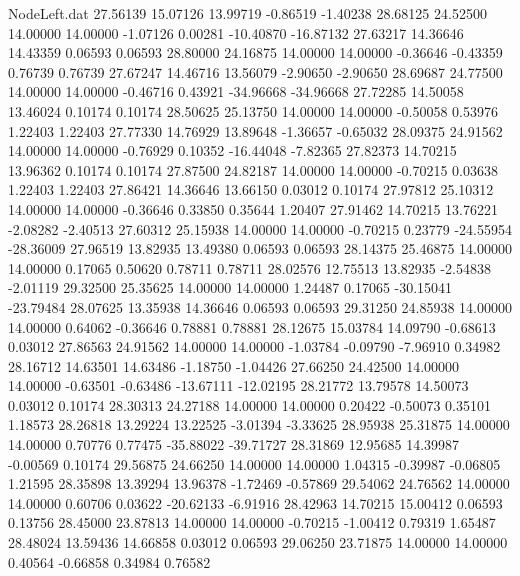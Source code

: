 \begin{filecontents}{NodeLeft.dat}
  27.56139   15.07126   13.99719    -0.86519   -1.40238   28.68125   24.52500   14.00000   14.00000   -1.07126    0.00281  -10.40870  -16.87132
  27.63217   14.36646   14.43359     0.06593    0.06593   28.80000   24.16875   14.00000   14.00000   -0.36646   -0.43359    0.76739    0.76739
  27.67247   14.46716   13.56079    -2.90650   -2.90650   28.69687   24.77500   14.00000   14.00000   -0.46716    0.43921  -34.96668  -34.96668
  27.72285   14.50058   13.46024     0.10174    0.10174   28.50625   25.13750   14.00000   14.00000   -0.50058    0.53976    1.22403    1.22403
  27.77330   14.76929   13.89648    -1.36657   -0.65032   28.09375   24.91562   14.00000   14.00000   -0.76929    0.10352  -16.44048   -7.82365
  27.82373   14.70215   13.96362     0.10174    0.10174   27.87500   24.82187   14.00000   14.00000   -0.70215    0.03638    1.22403    1.22403
  27.86421   14.36646   13.66150     0.03012    0.10174   27.97812   25.10312   14.00000   14.00000   -0.36646    0.33850    0.35644    1.20407
  27.91462   14.70215   13.76221    -2.08282   -2.40513   27.60312   25.15938   14.00000   14.00000   -0.70215    0.23779  -24.55954  -28.36009
  27.96519   13.82935   13.49380     0.06593    0.06593   28.14375   25.46875   14.00000   14.00000    0.17065    0.50620    0.78711    0.78711
  28.02576   12.75513   13.82935    -2.54838   -2.01119   29.32500   25.35625   14.00000   14.00000    1.24487    0.17065  -30.15041  -23.79484
  28.07625   13.35938   14.36646     0.06593    0.06593   29.31250   24.85938   14.00000   14.00000    0.64062   -0.36646    0.78881    0.78881
  28.12675   15.03784   14.09790    -0.68613    0.03012   27.86563   24.91562   14.00000   14.00000   -1.03784   -0.09790   -7.96910    0.34982
  28.16712   14.63501   14.63486    -1.18750   -1.04426   27.66250   24.42500   14.00000   14.00000   -0.63501   -0.63486  -13.67111  -12.02195
  28.21772   13.79578   14.50073     0.03012    0.10174   28.30313   24.27188   14.00000   14.00000    0.20422   -0.50073    0.35101    1.18573
  28.26818   13.29224   13.22525    -3.01394   -3.33625   28.95938   25.31875   14.00000   14.00000    0.70776    0.77475  -35.88022  -39.71727
  28.31869   12.95685   14.39987    -0.00569    0.10174   29.56875   24.66250   14.00000   14.00000    1.04315   -0.39987   -0.06805    1.21595
  28.35898   13.39294   13.96378    -1.72469   -0.57869   29.54062   24.76562   14.00000   14.00000    0.60706    0.03622  -20.62133   -6.91916
  28.42963   14.70215   15.00412     0.06593    0.13756   28.45000   23.87813   14.00000   14.00000   -0.70215   -1.00412    0.79319    1.65487
  28.48024   13.59436   14.66858     0.03012    0.06593   29.06250   23.71875   14.00000   14.00000    0.40564   -0.66858    0.34984    0.76582

\end{filecontents}
